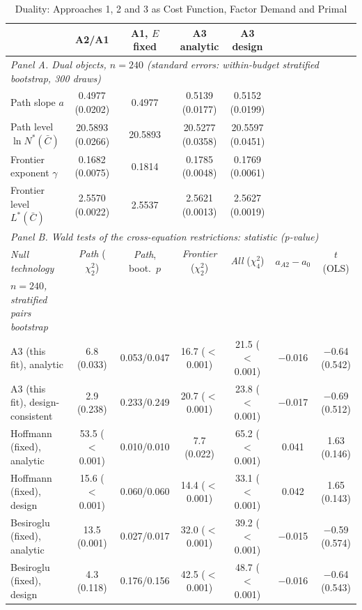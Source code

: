 \begin{table}[!htbp]
\centering
\scriptsize
\caption{Duality: Approaches 1, 2 and 3 as Cost Function, Factor Demand and Primal}
\label{tab:m1_duality}
\begin{threeparttable}
\begin{tabular}{lcccccc}
\toprule
 & A2/A1 & A1, $E$ fixed & A3 analytic & A3 design &  &  \\
\midrule
\multicolumn{7}{l}{\textit{Panel A. Dual objects, $n=240$ (standard errors: within-budget stratified bootstrap, 300 draws)}} \\
Path slope $a$ & 0.4977 (0.0202) & 0.4977 & 0.5139 (0.0177) & 0.5152 (0.0199) &  &  \\
Path level $\ln N^*(\bar C)$ & 20.5893 (0.0266) & 20.5893 & 20.5277 (0.0358) & 20.5597 (0.0451) &  &  \\
Frontier exponent $\gamma$ & 0.1682 (0.0075) & 0.1814 & 0.1785 (0.0048) & 0.1769 (0.0061) &  &  \\
Frontier level $L^*(\bar C)$ & 2.5570 (0.0022) & 2.5537 & 2.5621 (0.0013) & 2.5627 (0.0019) &  &  \\
\multicolumn{7}{l}{\textit{Panel B. Wald tests of the cross-equation restrictions: statistic (p-value)}} \\
\textit{Null technology} & \textit{Path} ($\chi^2_2$) & \textit{Path}, boot.\ $p$ & \textit{Frontier} ($\chi^2_2$) & \textit{All} ($\chi^2_4$) & $a_{A2}-a_0$ & $t$ (OLS) \\
\textit{$n=240$, stratified pairs bootstrap} &  &  &  &  &  &  \\
\quad A3 (this fit), analytic & 6.8 (0.033) & 0.053/0.047 & 16.7 ($<$0.001) & 21.5 ($<$0.001) & $-$0.016 & $-$0.64 (0.542) \\
\quad A3 (this fit), design-consistent & 2.9 (0.238) & 0.233/0.249 & 20.7 ($<$0.001) & 23.8 ($<$0.001) & $-$0.017 & $-$0.69 (0.512) \\
\quad Hoffmann (fixed), analytic & 53.5 ($<$0.001) & 0.010/0.010 & 7.7 (0.022) & 65.2 ($<$0.001) & 0.041 & 1.63 (0.146) \\
\quad Hoffmann (fixed), design & 15.6 ($<$0.001) & 0.060/0.060 & 14.4 ($<$0.001) & 33.1 ($<$0.001) & 0.042 & 1.65 (0.143) \\
\quad Besiroglu (fixed), analytic & 13.5 (0.001) & 0.027/0.017 & 32.0 ($<$0.001) & 39.2 ($<$0.001) & $-$0.015 & $-$0.59 (0.574) \\
\quad Besiroglu (fixed), design & 4.3 (0.118) & 0.176/0.156 & 42.5 ($<$0.001) & 48.7 ($<$0.001) & $-$0.016 & $-$0.64 (0.543) \\

\end{tabular}
\end{threeparttable}
\end{table}
